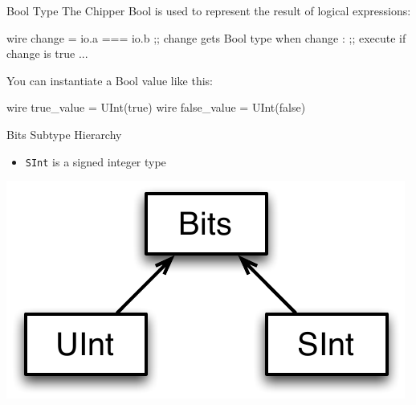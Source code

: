 \documentclass[xcolor=pdflatex,dvipsnames,table]{beamer}
\begin{document}
\begin{frame}[fragile]{Bool Type}
The Chipper Bool is used to represent the result of logical expressions:
\begin{stanza}
wire change = io.a === io.b ;; change gets Bool type
when change : ;; execute if change is true
 ...
\end{stanza}

You can instantiate a Bool value like this:
\begin{stanza}
wire true_value  = UInt(true)
wire false_value = UInt(false)
\end{stanza}

\end{frame}

\begin{frame}[fragile]{Bits Subtype Hierarchy}
\begin{itemize}
\item \verb+SInt+ is a signed integer type
\end{itemize}
\begin{center}
\includegraphics[height=0.7\textheight]{figs/bits-hierarchy.pdf}
\end{center}
\end{frame}
\end{document}
